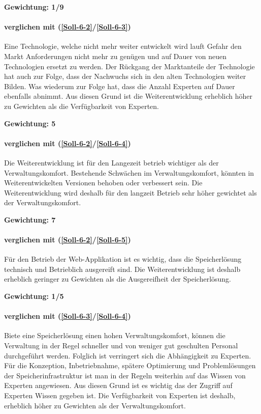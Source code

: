 \textbf{Gewichtung: 1/9}

\paragraph*{ verglichen mit  (\ref{Soll-6-2}/\ref{Soll-6-3})}
Eine Technologie, welche nicht mehr weiter entwickelt wird lauft Gefahr den Markt Anforderungen nicht mehr zu genügen und auf Dauer von neuen Technologien ersetzt zu werden. Der Rückgang der Marktanteile der Technologie hat auch zur Folge, dass der Nachwuchs sich in den alten Technologien weiter Bilden. Was wiederum zur Folge hat, dass die Anzahl Experten auf Dauer ebenfalls abnimmt. Aus diesen Grund ist die Weiterentwicklung erheblich höher zu Gewichten als die Verfügbarkeit von Experten.

\textbf{Gewichtung: 5}

\paragraph*{ verglichen mit  (\ref{Soll-6-2}/\ref{Soll-6-4})}

Die Weiterentwicklung ist für den Langezeit betrieb wichtiger als der Verwaltungskomfort. Bestehende Schwächen im Verwaltungskomfort, könnten in Weiterentwickelten Versionen behoben oder verbessert sein. Die Weiterentwicklung wird deshalb für den langzeit Betrieb sehr höher gewichtet als der Verwaltungskomfort.

\textbf{Gewichtung: 7}

\paragraph*{ verglichen mit  (\ref{Soll-6-2}/\ref{Soll-6-5})}
Für den Betrieb der Web-Applikation ist es wichtig, dass die Speicherlösung technisch und Betrieblich ausgereift sind. Die Weiterentwicklung ist deshalb erheblich geringer zu Gewichten als die Ausgereifheit der Speicherlösung.

\textbf{Gewichtung: 1/5}


\paragraph*{ verglichen mit  (\ref{Soll-6-3}/\ref{Soll-6-4})}
Biete eine Speicherlösung einen hohen Verwaltungskomfort, können die Verwaltung in der Regel schneller und von weniger gut geschulten Personal durchgeführt werden. Folglich ist verringert sich die Abhängigkeit zu Experten. Für die Konzeption, Inbetriebnahme, spätere Optimierung und Problemlösungen der Speicherinfrastruktur ist man in der Regeln weiterhin auf das Wissen von Experten angewiesen. Aus diesen Grund ist es wichtig das der Zugriff auf Experten Wissen gegeben ist. Die Verfügbarkeit von Experten ist deshalb, erheblich höher zu Gewichten als der Verwaltungskomfort. 

